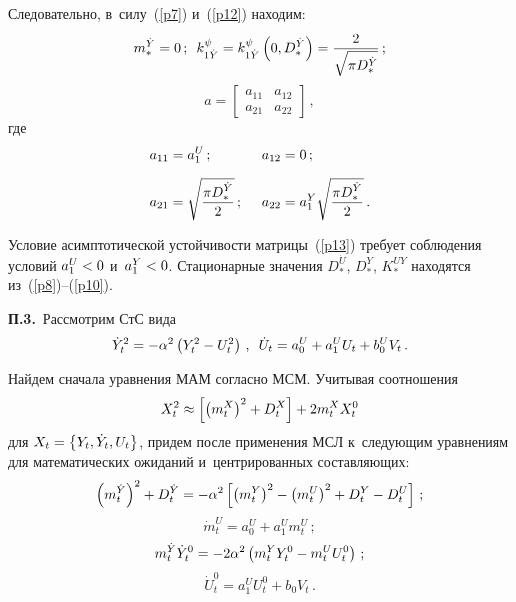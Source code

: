 \begin{multicols}{2}
{Следовательно, в~силу~(\ref{p7}) и~(\ref{p12}) находим:
    $$
    m^{\dot Y}_* =0\,;\enskip 
    k_{1\dot Y}^\psi =k_{1\dot Y}^\psi \left(0, D^{\dot Y}_*\right) = 
    \displaystyle\frac{\displaystyle 2\mathstrut}{\displaystyle \sqrt{\pi D_*^{\dot Y}  }\mathstrut}\,;
    $$
    \begin{equation}
    a=\begin{bmatrix}
     a_{11}&a_{12}\\
    a_{21}&a_{22}\end{bmatrix}\,,
    \label{p13}
    \end{equation}
    где
    \begin{alignat*}{2}
    a_{11} &= a_1^U\,; &\enskip 
    a_{12}&= 0\,; \\[6pt] 
    a_{21}&= \sqrt{\fr{\pi D_*^{\dot Y}}{2}}\,; &\enskip 
    a_{22}&= a_1^Y \sqrt{\fr{\pi D_*^{\dot Y}}{2}}\,.
   \end{alignat*}

Условие асимптотической устойчивости матрицы~(\ref{p13}) требует соблюдения 
условий $a_1^U \hm<0$ и~$a_1^Y\hm<0$. Стационарные значения 
$D_*^{\dot U}$, $D_*^Y$, $K^{UY}_*$ находятся из~(\ref{p8})--(\ref{p10}).

\smallskip

\noindent
\textbf{П.3.}\
Рассмотрим СтС вида
    \begin{equation*}
    \dot Y_t^2 =- \alpha^2 \left(Y_t^2 - U_t^2\right)\,, \enskip 
    \dot U_t = a_0^U + a_1^U U_t + b_0^U V_t\,.
    \end{equation*}

Найдем сначала уравнения МАМ согласно МСМ. Учитывая соотношения
    \begin{equation*}
    X_t^2 \approx \left[ \left(m_t^X\right)^2 + D_t^X \right] + 2 m_t^X X_t^0
    \end{equation*}
для  $X_t = \left\{ Y_t,\dot Y_t, U_t\right\}$,  придем после применения МСЛ 
к~следующим уравнениям для математических ожиданий и~центрированных составляющих:
    \begin{equation*}
    \left( m^{\dot Y}_t\right)^2 + D^{\dot Y}_t= -\alp^2 
    \lk \left(m^{Y}_t\right)^2 - \left(m_t^U\right)^2 + 
    D_t^Y - D_t^U\rk\,; %
    \end{equation*}
    \begin{equation*}
\dot m^{U}_t= a_0^U + a_1^U m_t^U\,; 
\end{equation*}
    \begin{equation*}
    m^{\dot Y}_t\dot Y_t^0 =-2\alpha^2 \left(m_t^Y Y_t^0 - m_t^U U_t^0\right)\,;
    \end{equation*}
    \begin{equation*}
    \dot U_t^0 =a_1^U U_t^0 + b_0 V_t\,.
    \end{equation*}

}
\end{multicols}
